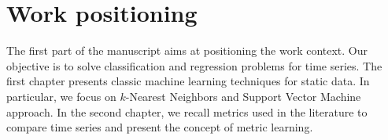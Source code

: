 \part{Work positioning}

The first part of the manuscript aims at positioning the work context. Our objective is to solve classification and regression problems for time series. The first chapter presents classic machine learning techniques for static data. In particular, we focus on $k$-Nearest Neighbors and Support Vector Machine approach. In the second chapter, we recall metrics used in the literature to compare time series and present the concept of metric learning. %

